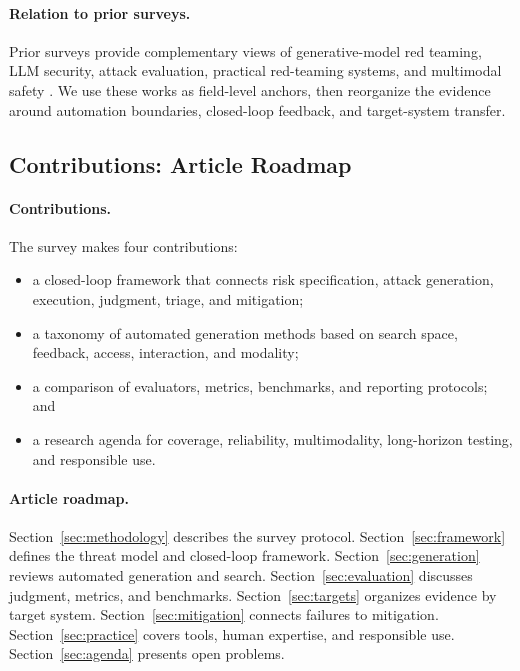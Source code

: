 \documentclass[review]{fcs}
\begin{document}
\paragraph{Relation to prior surveys.}
Prior surveys provide complementary views of generative-model red teaming, LLM security, attack evaluation, practical red-teaming systems, and multimodal safety \cite{Lin_2025,Das_2025,Jabbar_2025,purpura-etal-2025-building,liu2024safetymultimodallargelanguage}. We use these works as field-level anchors, then reorganize the evidence around automation boundaries, closed-loop feedback, and target-system transfer.

\subsection{Contributions: Article Roadmap}

\paragraph{Contributions.}
The survey makes four contributions:
\begin{itemize}
  \item a closed-loop framework that connects risk specification, attack generation, execution, judgment, triage, and mitigation;
  \item a taxonomy of automated generation methods based on search space, feedback, access, interaction, and modality;
  \item a comparison of evaluators, metrics, benchmarks, and reporting protocols; and
  \item a research agenda for coverage, reliability, multimodality, long-horizon testing, and responsible use.
\end{itemize}

\paragraph{Article roadmap.}
Section~\ref{sec:methodology} describes the survey protocol. Section~\ref{sec:framework} defines the threat model and closed-loop framework. Section~\ref{sec:generation} reviews automated generation and search. Section~\ref{sec:evaluation} discusses judgment, metrics, and benchmarks. Section~\ref{sec:targets} organizes evidence by target system. Section~\ref{sec:mitigation} connects failures to mitigation. Section~\ref{sec:practice} covers tools, human expertise, and responsible use. Section~\ref{sec:agenda} presents open problems.
\end{document}
